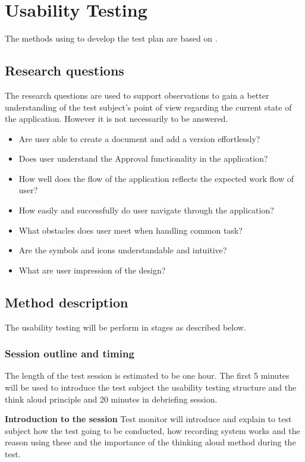 \chapter{Usability Testing} \label{bilag:utestbilag}
The methods using to develop the test plan are based on \citep[p.~65-91]{HandbookofUsabilityTesting}.

\section{Research questions}
The research questions are used to support observations to gain a better understanding of the test subject's point of view regarding the current state of the application.
However it is not necessarily to be answered.

\begin{itemize}
	\item Are user able to create a document and add a version effortlessly?
	\item Does user understand the Approval functionality in the application?
	\item How well does the flow of the application reflects the expected work flow of user?
	\item How easily and successfully do user navigate through the application?
	\item What obstacles does user meet when handling common task?
	\item Are the symbols and icons understandable and intuitive?
	\item What are user impression of the design?
\end{itemize}

\section{Method description}
The usability testing will be perform in stages as described below.

\subsection{Session outline and timing}
The length of the test session is estimated to be one hour. The first 5 minutes will be used to introduce the test subject the usability testing structure and the think aloud principle and 20 minutes in debriefing session.

\textbf{Introduction to the session}
Test monitor will introduce and explain to test subject how the test going to be conducted, how recording system works and the reason using these and the importance of the thinking aloud method during the test.

